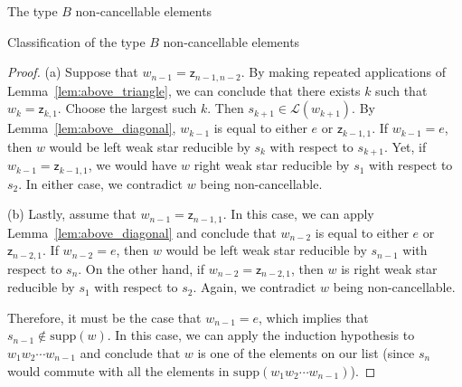 \documentclass[12pt]{amsart}
\newcommand{\z}{\mathsf{z}}
\newcommand{\supp}{\mathrm{supp}}
\renewcommand{\L}{\mathcal{L}}
\renewcommand{\(}{\left(}
\renewcommand{\)}{\right)}
\begin{document}
\begin{section}{The type $B$ non-cancellable elements}
\begin{subsection}{Classification of the type $B$ non-cancellable elements}
\begin{proof}
(a)  Suppose that $w_{n-1}=\z_{n-1,n-2}$.  By making repeated applications of Lemma~\ref{lem:above_triangle}, we can conclude that there exists $k$ such that $w_{k}=\z_{k,1}$.   Choose the largest such $k$.  Then $s_{k+1}\in \L(w_{k+1})$.  By Lemma~\ref{lem:above_diagonal}, $w_{k-1}$ is equal to either $e$ or $\z_{k-1,1}$.  If $w_{k-1}=e$, then $w$ would be left weak star reducible by $s_{k}$ with respect to $s_{k+1}$.  Yet, if $w_{k-1}=\z_{k-1,1}$, we would have $w$ right weak star reducible by $s_{1}$ with respect to $s_{2}$.  In either case, we contradict $w$ being non-cancellable.

(b) Lastly, assume that $w_{n-1}=\z_{n-1,1}$.  In this case, we can apply Lemma~\ref{lem:above_diagonal} and conclude that $w_{n-2}$ is equal to either $e$ or $\z_{n-2,1}$.  If $w_{n-2}=e$, then $w$ would be left weak star reducible by $s_{n-1}$ with respect to $s_{n}$.  On the other hand, if $w_{n-2}=\z_{n-2,1}$, then $w$ is right weak star reducible by $s_{1}$ with respect to $s_{2}$.  Again, we contradict $w$ being non-cancellable.

Therefore, it must be the case that $w_{n-1}=e$, which implies that $s_{n-1}\notin \supp(w)$.  In this case, we can apply the induction hypothesis to $w_{1}w_{2}\cdots w_{n-1}$ and conclude that $w$ is one of the elements on our list (since $s_{n}$ would commute with all the elements in $\supp(w_{1}w_{2}\cdots w_{n-1})$).
\end{proof}

\end{subsection}

\end{section}

\end{document}

